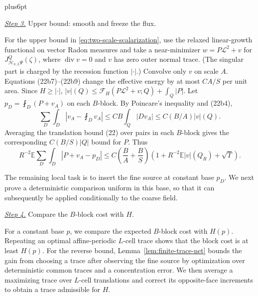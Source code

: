 \documentclass[11pt,reqno]{amsart}
\makeatletter
\theoremstyle{plain}
\theoremstyle{definition}
\theoremstyle{remark}
\renewenvironment{proof}[1][\proofname]{%
  \par
  \pushQED{\qed}%
  \normalfont
  \topsep6pt plus6pt\relax
  \trivlist
  \item[\hskip\labelsep\slshape #1\@addpunct{.}]%
  \ignorespaces
}{%
  \popQED
  \endtrivlist
  \@endpefalse
}
\DeclareRobustCommand{\qed}{%
  \leavevmode\unskip\penalty9999\hbox{}\nobreak
  \ifmmode
    \makebox[0pt][l]{\qquad\hbox{\qedsymbol}}%
  \else
    \qquad\hbox{\qedsymbol}%
  \fi
}
\renewcommand{\qedsymbol}{\rule[.47pt]{4pt}{6pt}}
\numberwithin{equation}{section}
\newcommand{\1}{\mathbf 1}
\makeatother
\begin{document}
\begin{proof}
\smallskip\noindent
\underline{\textit{Step 3.}} Upper bound: smooth and freeze the flux.

For the upper bound in \eqref{eq:two-scale-scalarization}, use the relaxed linear-growth functional on
vector Radon measures and take a near-minimizer
$w=P\mathcal L^2+v$ for
$J_ {\mathcal H_ {h,L}\Psi}^Q(\zeta)$, where
$\operatorname {div}v=0$ and $v$ has zero outer normal trace.
(The singular part is charged by the recession
function $|\cdot|$.) Convolve only $v$ on scale $A$.  Equations
(22b7)--(22b9) change the effective energy by at most $CA/S$ per unit
area.  Since $H\geq|\cdot|$,
$|v|(Q)\leq\mathcal F_ H(P\mathcal L^2+v;Q)+\int_ Q|P|$.
Let $p_ D=\fint_ D(P+v_ A)$ on each $B$-block.  By Poincare's
inequality and (22b4),
\begin{equation*}
\sum_ D\int_ D\left|v_ A-\fint_ D v_ A\right|
\leq CB\int_ Q|Dv_ A|\leq C(B/A)|v|(Q).
\end{equation*}
Averaging the translation bound (22) over pairs in each $B$-block
gives the corresponding $C(B/S)|Q|$ bound for $P$.  Thus
\begin{equation}
R^{-2}\mathbb E\sum_ D\int_ D|P+v_ A-p_ D|
\leq C\left(\frac BA+\frac BS\right)
\left(1+R^{-2}\mathbb E|v|(Q_ R)+\sqrt T\right).
\tag{25}
\end{equation}

The remaining local task is to insert the fine source at constant base
$p_D$.  We next prove a deterministic comparison uniform in this base,
so that it can subsequently be applied conditionally to the coarse field.

\smallskip\noindent
\underline{\textit{Step 4.}} Compare the $B$-block cost with $H$.

For a constant base $p$, we compare the expected $B$-block cost with
$H(p)$.  Repeating an optimal affine-periodic $L$-cell trace shows that
the block cost is at least $H(p)$.  For the reverse bound,
Lemma~\ref{lem:finite-trace-net} bounds the
gain from choosing a trace after observing the fine source by
optimization over deterministic common traces and a concentration
error.  We then average a maximizing trace over $L$-cell translations
and correct its opposite-face increments to obtain a trace admissible
for $H$.


\end{proof}
\end{document}
